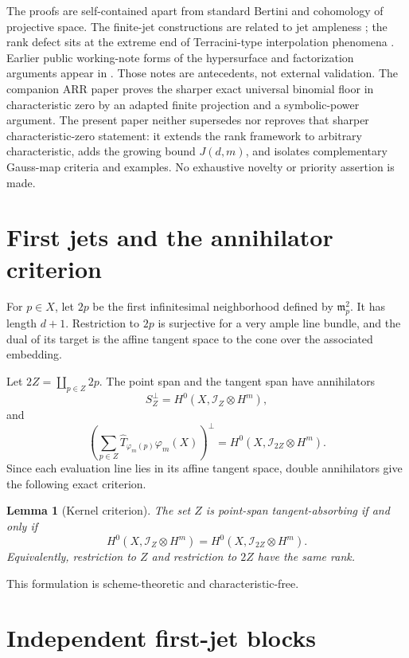 \documentclass[11pt]{article}
\newtheorem{lemma}[theorem]{Lemma}
\begin{document}
The proofs are self-contained apart from standard Bertini and cohomology of
projective space.  The finite-jet constructions are related to jet ampleness
\cite{BeltramettiDiRoccoSommese1999}; the rank defect sits at the extreme end
of Terracini-type interpolation phenomena
\cite{BallicoChiantini2021,GaluppiEtAl2023}.  Earlier public working-note
forms of the hypersurface and factorization arguments appear in
\cite{ErikssonB219,ErikssonB220}.  Those notes are antecedents, not external
validation.  The companion ARR paper \cite{ErikssonExactARR2026} proves the
sharper exact universal binomial floor in characteristic zero by an adapted
finite projection and a symbolic-power argument.  The present paper neither
supersedes nor reproves that sharper characteristic-zero statement: it
extends the rank framework to arbitrary characteristic, adds the growing
bound $J(d,m)$, and isolates complementary Gauss-map criteria and examples.
No exhaustive novelty or priority assertion is made.

\section{First jets and the annihilator criterion}

For $p\in X$, let $2p$ be the first infinitesimal neighborhood defined by
$\mathfrak m_p^2$.  It has length $d+1$.  Restriction to $2p$ is surjective
for a very ample line bundle, and the dual of its target is the affine tangent
space to the cone over the associated embedding.

Let $2Z=\coprod_{p\in Z}2p$.  The point span and the tangent span have
annihilators
\[
 S_Z^\perp=H^0(X,\mathcal I_Z\otimes H^m),
\]
and
\[
 \left(\sum_{p\in Z}
 \widehat T_{\varphi_m(p)}\varphi_m(X)\right)^\perp
 =H^0(X,\mathcal I_{2Z}\otimes H^m).
\]
Since each evaluation line lies in its affine tangent space, double
annihilators give the following exact criterion.

\begin{lemma}[Kernel criterion]\label{lem:kernel}
The set $Z$ is point-span tangent-absorbing if and only if
\[
 H^0(X,\mathcal I_Z\otimes H^m)
 =H^0(X,\mathcal I_{2Z}\otimes H^m).
\]
Equivalently, restriction to $Z$ and restriction to $2Z$ have the same rank.
\end{lemma}

This formulation is scheme-theoretic and characteristic-free.

\section{Independent first-jet blocks}
\end{document}
